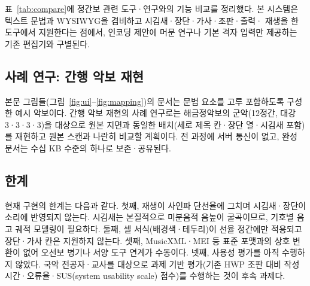 표~\ref{tab:compare}에 정간보 관련 도구·연구와의 기능 비교를 정리했다.
본 시스템은 텍스트 문법과 WYSIWYG을 겸비하고 시김새·장단·가사·조판·출력·
재생을 한 도구에서 지원한다는 점에서, 인코딩 제안에 머문 연구나 기본
격자 입력만 제공하는 기존 편집기와 구별된다.

\subsection{사례 연구: 간행 악보 재현}

본문 그림들(그림~\ref{fig:ui}--\ref{fig:mapping})의 문서는 문법 요소를
고루 포함하도록 구성한 예시 악보이다. 간행 악보 재현의 사례 연구로는
해금정악보의 군악(12정간, 대강 3·3·3·3)을 대상으로 원본 지면과 동일한
배치(세로 제목 칸·장단 열·시김새 포함)를 재현하고 원본 스캔과 나란히
비교할 계획이다.
전 과정에 서버 통신이 없고, 완성 문서는 수십 KB 수준의
 하나로 보존·공유된다.

\subsection{한계}

현재 구현의 한계는 다음과 같다.
첫째, 재생이 사인파 단선율에 그치며 시김새·장단이 소리에 반영되지 않는다.
시김새는 본질적으로 미분음적 음높이 굴곡이므로, 기호별 음고 궤적
모델링이 필요하다.
둘째, 셀 서식(배경색·테두리)이 선율 정간에만 적용되고 장단·가사 칸은
지원하지 않는다.
셋째, MusicXML·MEI 등 표준 포맷과의 상호 변환이 없어 오선보 병기나
서양 도구 연계가 수동이다.
넷째, 사용성 평가를 아직 수행하지 않았다. 국악 전공자·교사를 대상으로
과제 기반 평가(기존 HWP 조판 대비 작성 시간·오류율·SUS(system usability
scale) 점수)를 수행하는
것이 후속 과제다. 
